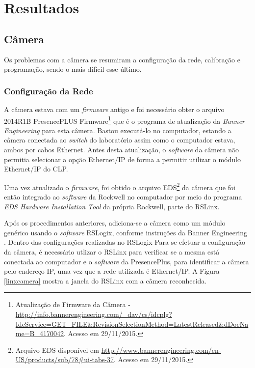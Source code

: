 \chapter{Resultados\label{chap:Resultados}}



\section{Câmera}

Os problemas com a câmera se resumiram a configuração da rede, calibração e programação, sendo o mais difícil esse último.

\subsection{Configuração da Rede}
A câmera estava com um \textit{firmware} antigo e foi necessário obter o arquivo 2014R1B PresencePLUS Firmware\footnote{Atualização de Firmware da Câmera - \url{http://info.bannerengineering.com/_dav/cs/idcplg?IdcService=GET_FILE&RevisionSelectionMethod=LatestReleased&dDocName=B_4170042}. Acesso em 29/11/2015.} que é o programa de atualização da \textit{Banner Engineering} para esta câmera. Bastou executá-lo no computador, estando a câmera conectada ao \textit{switch} do laboratório assim como o computador estava, ambos por cabos Ethernet. Antes desta atualização, o \textit{software} da câmera não permitia selecionar a opção Ethernet/IP de forma a permitir utilizar o módulo Ethernet/IP do CLP.

Uma vez atualizado o \textit{firmware}, foi obtido o arquivo EDS\footnote{Arquivo EDS disponível em \url{http://www.bannerengineering.com/en-US/products/sub/78\#ui-tabs-37}. Acesso em 29/11/2015.} da câmera que foi então integrado ao \textit{software} da Rockwell no computador por meio do programa \textit{EDS Hardware Installation Tool} da própria Rockwell, parte do RSLinx.

Após os procedimentos anteriores, adiciona-se a câmera como um módulo genérico usando o \textit{software} RSLogix, conforme instruções da Banner Engineering \cite{presencePlusEthernetIP}. Dentro das configurações realizadas no RSLogix Para se efetuar a configuração da câmera, é necessário utlizar o RSLinx para verificar se a mesma está conectada ao computador e o \textit{software} da PresencePlus, para identificar a câmera pelo endereço IP, uma vez que a rede utilizada é Ethernet/IP. A Figura \ref{linxcamera} mostra a janela do RSLinx com a câmera reconhecida.

